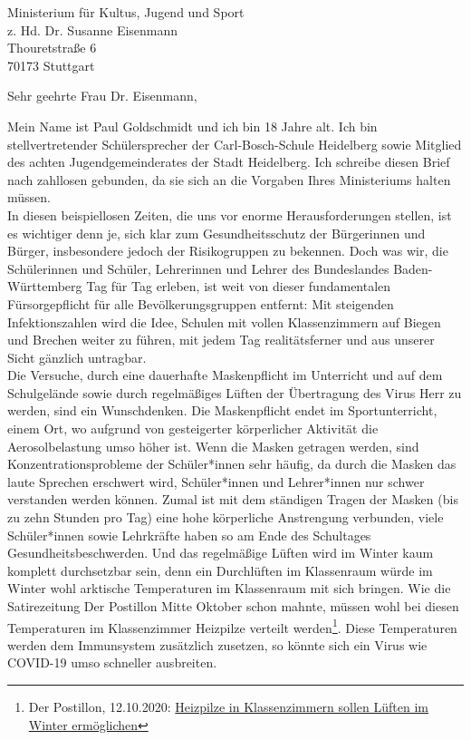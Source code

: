 \documentclass[
	fontsize=12pt,
	parskip=full,
	paper=A4,	
	fromalign=right,
	fromemail=true,
	version=last,
]{scrlttr2}
\begin{document}
\begin{letter}{
	Ministerium für Kultus, Jugend und Sport\\
	z. Hd. Dr. Susanne Eisenmann\\
	Thouretstraße 6\\
	70173 Stuttgart 
}
	
\opening{Sehr geehrte Frau Dr. Eisenmann,}

Mein Name ist Paul Goldschmidt und ich bin 18 Jahre alt. Ich bin stellvertretender Schülersprecher der Carl-Bosch-Schule Heidelberg sowie Mitglied des achten Jugendgemeinderates der Stadt Heidelberg. Ich schreibe diesen Brief nach zahllosen gebunden, da sie sich an die Vorgaben Ihres Ministeriums halten müssen.\\
In diesen beispiellosen Zeiten, die uns vor enorme Herausforderungen stellen, ist es wichtiger denn je, sich klar zum Gesundheitsschutz der Bürgerinnen und Bürger, insbesondere jedoch der Risikogruppen zu bekennen. Doch was wir, die Schülerinnen und Schüler, Lehrerinnen und Lehrer des Bundeslandes Baden-Württemberg Tag für Tag erleben, ist weit von dieser fundamentalen Fürsorgepflicht für alle Bevölkerungsgruppen entfernt: Mit steigenden Infektionszahlen wird die Idee, Schulen mit vollen Klassenzimmern auf Biegen und Brechen weiter zu führen, mit jedem Tag realitätsferner und aus unserer Sicht gänzlich untragbar. \\
Die Versuche, durch eine dauerhafte Maskenpflicht im Unterricht und auf dem Schulgelände sowie durch regelmäßiges Lüften der Übertragung des Virus Herr zu werden, sind ein Wunschdenken. Die Maskenpflicht endet im Sportunterricht, einem Ort, wo aufgrund von gesteigerter körperlicher Aktivität die Aerosolbelastung umso höher ist. Wenn die Masken getragen werden, sind Konzentrationsprobleme der Schüler*innen sehr häufig, da durch die Masken das laute Sprechen erschwert wird, Schüler*innen und Lehrer*innen nur schwer verstanden werden können. Zumal ist mit dem ständigen Tragen der Masken (bis zu zehn Stunden pro Tag) eine hohe körperliche Anstrengung verbunden, viele Schüler*innen sowie Lehrkräfte haben so am Ende des Schultages Gesundheitsbeschwerden. Und das regelmäßige Lüften wird im Winter kaum komplett durchsetzbar sein, denn ein Durchlüften im Klassenraum würde im Winter wohl arktische Temperaturen im Klassenraum mit sich bringen. Wie die Satirezeitung \glqq Der Postillon\grqq{} Mitte Oktober schon mahnte, müssen wohl bei diesen Temperaturen im Klassenzimmer Heizpilze verteilt werden\footnote{Der Postillon, 12.10.2020: \glqq \href{https://www.der-postillon.com/2020/10/heizpilze.html}{\color{blue}Heizpilze in Klassenzimmern sollen Lüften im Winter ermöglichen\grqq}}. Diese Temperaturen werden dem Immunsystem zusätzlich zusetzen, so könnte sich ein Virus wie COVID-19 umso schneller ausbreiten. \\


\end{letter}
\end{document}
